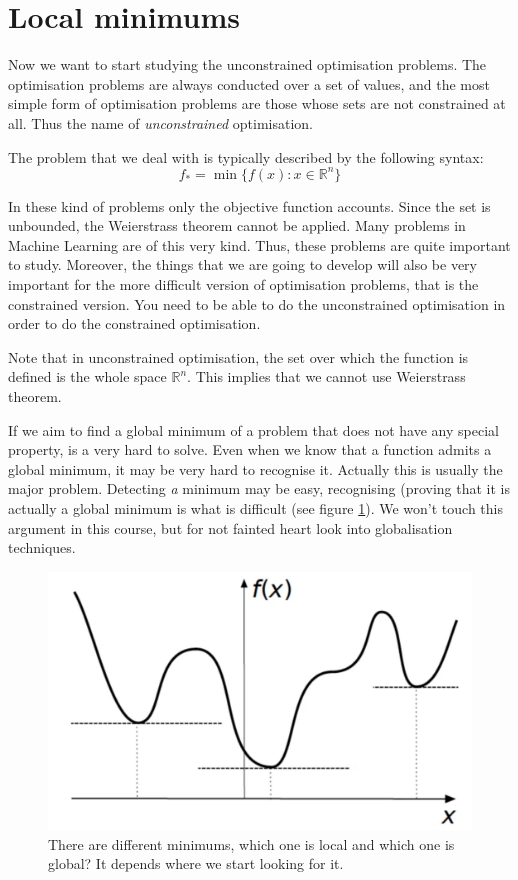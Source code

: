 \section{Local minimums}
\par Now we want to start studying the unconstrained optimisation problems. The optimisation problems are always conducted over a set of values, and the most simple form of optimisation problems are those whose sets are not constrained at all. Thus the name of \textit{unconstrained} optimisation.
\par The problem that we deal with is typically described by the following syntax:
\begin{equation}
    f_* = \min \{f(x) : x \in \mathbb{R}^n\}
\end{equation}
\par In these kind of problems only the objective function accounts. Since the set is unbounded, the Weierstrass theorem cannot be applied. Many problems in Machine Learning are of this very kind. Thus, these problems are quite important to study. Moreover, the things that we are going to develop will also be very important for the more difficult version of optimisation problems, that is the constrained version. You need to be able to do the unconstrained optimisation in order to do the constrained optimisation.
\par Note that in unconstrained optimisation, the set over which the function is defined is the whole space $\mathbb{R}^n$. This implies that we cannot use Weierstrass theorem.
\par If we aim to find a global minimum of a problem that does not have any special property, is a very hard to solve. Even when we know that a function admits a global minimum, it may be very hard to recognise it. Actually this is usually the major problem. Detecting \textit{a} minimum may be easy, recognising (proving that it is actually a global minimum is what is difficult (see figure \ref{fig:chapter2-many_minimums}). We won't touch this argument in this course, but for not fainted heart look into globalisation techniques.
\begin{figure}
    \centering
    \includegraphics[scale=0.3]{figures/2/chapter2-many_minimums.png}
    \caption{There are different minimums, which one is local and which one is global? It depends where we start looking for it.}
    \label{fig:chapter2-many_minimums}
\end{figure}
